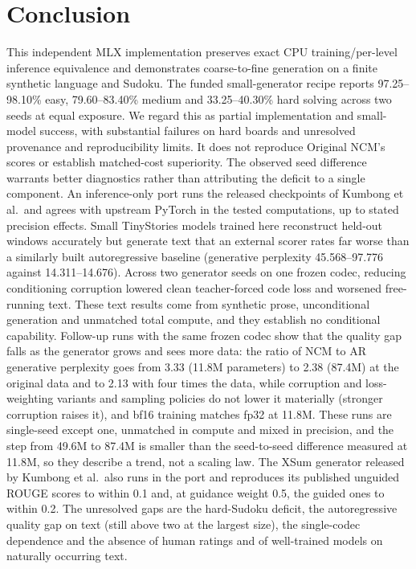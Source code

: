 \documentclass[
  british,
]{article}
\begin{document}
\section{Conclusion}\label{conclusion}

This independent MLX implementation preserves exact CPU
training/per-level inference equivalence and demonstrates coarse-to-fine
generation on a finite synthetic language and Sudoku. The funded
small-generator recipe reports 97.25--98.10\% easy, 79.60--83.40\%
medium and 33.25--40.30\% hard solving across two seeds at equal
exposure. We regard this as partial implementation and small-model
success, with substantial failures on hard boards and unresolved
provenance and reproducibility limits. It does not reproduce Original
NCM's scores or establish matched-cost superiority. The observed seed
difference warrants better diagnostics rather than attributing the
deficit to a single component. An inference-only port runs the released
checkpoints of Kumbong et al.~and agrees with upstream PyTorch in the
tested computations, up to stated precision effects. Small TinyStories
models trained here reconstruct held-out windows accurately but generate
text that an external scorer rates far worse than a similarly built
autoregressive baseline (generative perplexity 45.568--97.776 against
14.311--14.676). Across two generator seeds on one frozen codec,
reducing conditioning corruption lowered clean teacher-forced code loss
and worsened free-running text. These text results come from synthetic
prose, unconditional generation and unmatched total compute, and they
establish no conditional capability. Follow-up runs with the same frozen
codec show that the quality gap falls as the generator grows and sees
more data: the ratio of NCM to AR generative perplexity goes from 3.33
(11.8M parameters) to 2.38 (87.4M) at the original data and to 2.13 with
four times the data, while corruption and loss-weighting variants and
sampling policies do not lower it materially (stronger corruption raises
it), and bf16 training matches fp32 at 11.8M. These runs are single-seed
except one, unmatched in compute and mixed in precision, and the step
from 49.6M to 87.4M is smaller than the seed-to-seed difference measured
at 11.8M, so they describe a trend, not a scaling law. The XSum
generator released by Kumbong et al.~also runs in the port and
reproduces its published unguided ROUGE scores to within 0.1 and, at
guidance weight 0.5, the guided ones to within 0.2. The unresolved gaps
are the hard-Sudoku deficit, the autoregressive quality gap on text
(still above two at the largest size), the single-codec dependence and
the absence of human ratings and of well-trained models on naturally
occurring text.
\end{document}
